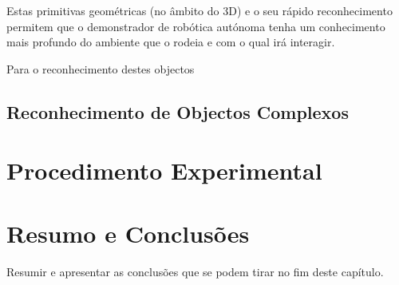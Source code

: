Estas primitivas geométricas (no âmbito do 3D) e o seu rápido reconhecimento permitem que o
demonstrador de robótica autónoma tenha um conhecimento mais profundo do ambiente que o 
rodeia e com o qual irá interagir.

Para o reconhecimento destes objectos 
 
\subsection{Reconhecimento de Objectos Complexos}

\section{ Procedimento Experimental}


\section{Resumo e Conclusões}

Resumir e apresentar as conclusões que se podem tirar no fim deste
capítulo.
